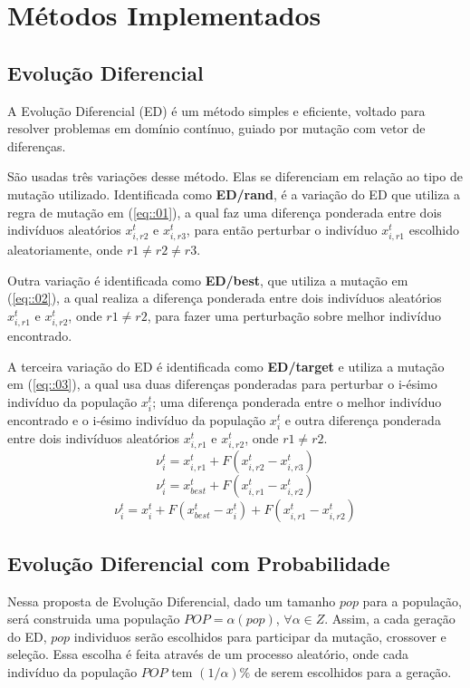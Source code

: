 \documentclass[12pt]{article}
\begin{document}
\section*{Métodos Implementados}
\subsection*{Evolução Diferencial}
A Evolução Diferencial (ED) é um método simples e eficiente, voltado para resolver problemas em domínio contínuo, guiado por mutação com vetor de diferenças. 

São usadas três variações desse método. Elas se diferenciam em relação ao tipo de mutação utilizado. Identificada como \textbf{ED/rand}, é a variação do ED que utiliza a regra de mutação em (\ref{eq::01}), a qual faz uma diferença ponderada entre dois indivíduos aleatórios $x_{i,r2}^t$ e  $x_{i,r3}^t$, para então perturbar o indivíduo $x_{i,r1}^t$ escolhido aleatoriamente, onde $r1\neq r2 \neq r3$. 

Outra variação é identificada como \textbf{ED/best}, que utiliza a mutação em (\ref{eq::02}), a qual realiza a diferença ponderada entre dois indivíduos aleatórios $x_{i,r1}^t$ e  $x_{i,r2}^t$, onde $r1\neq r2$, para fazer uma perturbação sobre melhor indivíduo encontrado.

A terceira variação do ED é identificada como \textbf{ED/target} e utiliza a mutação em (\ref{eq::03}), a qual usa duas diferenças ponderadas para perturbar o i-ésimo indivíduo da população $x_{i}^t$; uma diferença ponderada entre o melhor indivíduo encontrado e o i-ésimo indivíduo da população $x_{i}^t$ e outra diferença ponderada entre dois indivíduos aleatórios $x_{i,r1}^t$ e  $x_{i,r2}^t$, onde $r1\neq r2$. 
\begin{equation}
\label{eq::01}
	\nu_i^t = x_{i,r1}^t + F(x_{i,r2}^t - x_{i,r3}^t)
\end{equation} 
\begin{equation}
\label{eq::02}
	\nu_i^t = x_{best}^t + F(x_{i,r1}^t - x_{i,r2}^t)
\end{equation}
\begin{equation}
\label{eq::03}
	\nu_i^t = x_{i}^t + F(x_{best}^t - x_{i}^t) + F(x_{i,r1}^t - x_{i,r2}^t)
\end{equation} 

\subsection*{Evolução Diferencial com Probabilidade}
Nessa proposta de Evolução Diferencial, dado um tamanho $pop$ para a população, será construida uma população $POP = \alpha (pop)$, $\forall \alpha \in Z$. Assim, a cada geração do ED, $pop$ individuos serão escolhidos para participar da mutação, crossover e seleção. Essa escolha é feita através de um processo aleatório, onde cada indivíduo da população $POP$ tem $(1/\alpha) \%$ de serem escolhidos para a geração.
\end{document}
